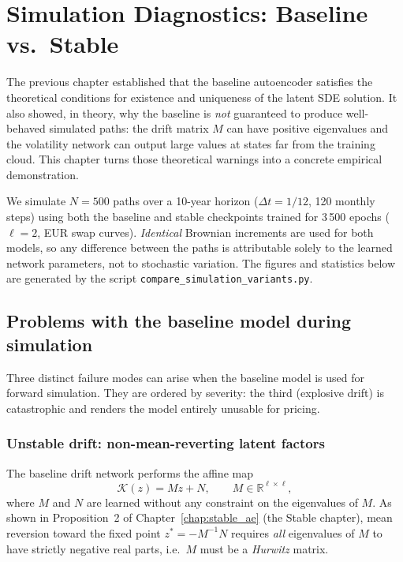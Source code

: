 \chapter{Simulation Diagnostics: Baseline vs.\ Stable}
\label{chap:sim_comparison}

The previous chapter established that the baseline autoencoder satisfies the
theoretical conditions for existence and uniqueness of the latent SDE solution.
It also showed, in theory, why the baseline is \emph{not} guaranteed to produce
well-behaved simulated paths: the drift matrix $M$ can have positive eigenvalues
and the volatility network can output large values at states far from the training
cloud.
This chapter turns those theoretical warnings into a concrete empirical demonstration.

We simulate $N = 500$ paths over a 10-year horizon ($\Delta t = 1/12$, 120 monthly
steps) using both the baseline and stable checkpoints trained for 3\,500 epochs
($\ell = 2$, EUR swap curves).
\emph{Identical} Brownian increments are used for both models, so any difference
between the paths is attributable solely to the learned network parameters, not to
stochastic variation.
The figures and statistics below are generated by the script
\texttt{compare\_simulation\_variants.py}.


\section{Problems with the baseline model during simulation}
\label{sec:sim_baseline_problems}

Three distinct failure modes can arise when the baseline model is used for
forward simulation.  They are ordered by severity: the third (explosive drift)
is catastrophic and renders the model entirely unusable for pricing.

\subsection{Unstable drift: non-mean-reverting latent factors}
\label{subsec:unstable_drift}

The baseline drift network performs the affine map
\[
    \mathcal{K}(z) = Mz + N, \qquad M \in \mathbb{R}^{\ell \times \ell},
\]
where $M$ and $N$ are learned without any constraint on the eigenvalues of $M$.
As shown in Proposition~2 of Chapter~\ref{chap:stable_ae} (the Stable chapter),
mean reversion toward the fixed point $z^* = -M^{-1}N$ requires \emph{all}
eigenvalues of $M$ to have strictly negative real parts, i.e.\ $M$ must be
a \emph{Hurwitz} matrix.

